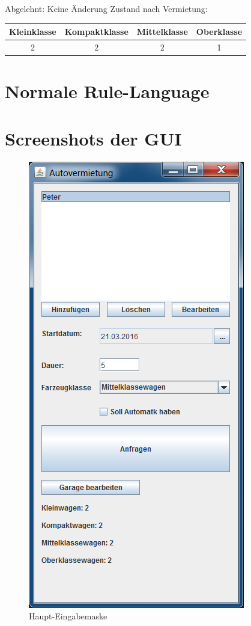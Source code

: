 Abgelehnt: Keine Änderung
Zustand nach Vermietung:\\
\begin{tabular}{|c|c|c|c|}
	\hline \textbf{Kleinklasse} & \textbf{Kompaktklasse} & \textbf{Mittelklasse} & \textbf{Oberklasse}  \\ 
	\hline 2 & 2 & 2 & 1 \\ 
	\hline 
\end{tabular}

\newpage
\section{Normale Rule-Language}
\label{anh:normal-rules}



\newpage
\section{Screenshots der GUI}
\label{anh:screenshots}

\begin{figure}[htb]
	\centering
	\includegraphics[width=0.53\linewidth]{Bilder/Screenshots/Autovermietung}
	\caption{Haupt-Eingabemaske }
	\label{fig:Autovermietung}
\end{figure}


